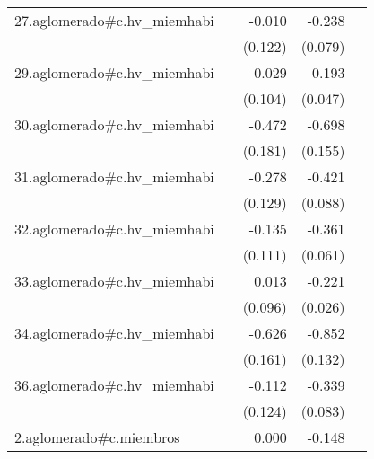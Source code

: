 {\begin{longtable}{l*{4}{D{.}{.}{-1}}}
\addlinespace
27.aglomerado#c.hv\_miemhabi&                     &      -0.010         &      -0.238\sym{**} &                     \\
            &                     &     (0.122)         &     (0.079)         &                     \\
\addlinespace
29.aglomerado#c.hv\_miemhabi&                     &       0.029         &      -0.193\sym{***}&                     \\
            &                     &     (0.104)         &     (0.047)         &                     \\
\addlinespace
30.aglomerado#c.hv\_miemhabi&                     &      -0.472\sym{**} &      -0.698\sym{***}&                     \\
            &                     &     (0.181)         &     (0.155)         &                     \\
\addlinespace
31.aglomerado#c.hv\_miemhabi&                     &      -0.278\sym{*}  &      -0.421\sym{***}&                     \\
            &                     &     (0.129)         &     (0.088)         &                     \\
\addlinespace
32.aglomerado#c.hv\_miemhabi&                     &      -0.135         &      -0.361\sym{***}&                     \\
            &                     &     (0.111)         &     (0.061)         &                     \\
\addlinespace
33.aglomerado#c.hv\_miemhabi&                     &       0.013         &      -0.221\sym{***}&                     \\
            &                     &     (0.096)         &     (0.026)         &                     \\
\addlinespace
34.aglomerado#c.hv\_miemhabi&                     &      -0.626\sym{***}&      -0.852\sym{***}&                     \\
            &                     &     (0.161)         &     (0.132)         &                     \\
\addlinespace
36.aglomerado#c.hv\_miemhabi&                     &      -0.112         &      -0.339\sym{***}&                     \\
            &                     &     (0.124)         &     (0.083)         &                     \\
\addlinespace
2.aglomerado#c.miembros&                     &       0.000         &      -0.148\sym{***}&                     \\

\end{longtable}}
